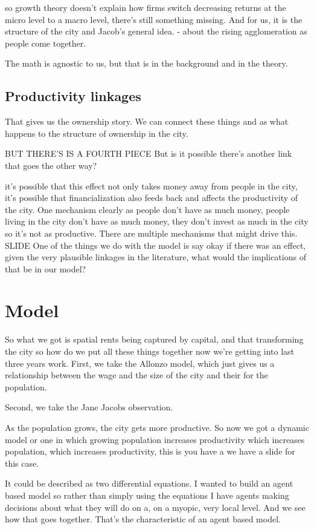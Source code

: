 so growth theory doesn't explain how firms switch decreasing returns at the micro level to a macro level, there's still something missing. 
And for us, it is the structure of the city and Jacob's general idea. - about the rising agglomeration as people come together. 


The math is agnostic to us, but that is in the background and in the theory. 


\subsection{Productivity linkages}

That gives us the ownership story. We can connect these things and as what happens to the structure of ownership in the city. 

BUT THERE'S IS A FOURTH PIECE
But is it possible there's another link that goes the other way?

it's  possible that this effect not only takes money away from people in the city, it's possible that financialization also feeds back and  affects the productivity of the city. One mechanism clearly as people don't have as much money, people living in the city don't have as much money, they don't invest as much in the city so it's not as productive. 
There are multiple mechanisms that might drive this. SLIDE
One of the things we do with the model is say okay if there was an effect, given the very plausible linkages in the literature, what would the implications of that be in our model?

\section{Model}

So what we got is spatial rents being captured by capital, and that transforming the city so how do we put all these things together now we're getting into last three years work.
First, we take the Allonzo model, which just gives us a relationship between the wage and the size of the city and their for the population.

Second, we take the Jane Jacobs observation.

As the population grows, the city gets more productive. So now we got a dynamic model or one in which growing population increases productivity which increases population, which increases productivity, this is you have a we have a slide for this case.

It could be described as two differential equations. I wanted to build an agent based model so rather than simply using the equations I have agents making decisions about what they will do on a, on a myopic, very local level. And we see how that goes together. That's the characteristic of an agent based model.

